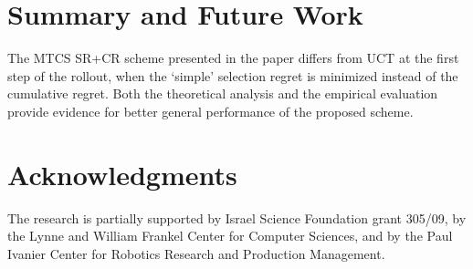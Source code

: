 \documentclass[letterpaper]{article}
\begin{document}
\section{Summary and Future Work}
\label{sec:summary}

The MTCS SR+CR scheme presented in the paper differs
from UCT at the first step of the rollout, when the `simple' selection
regret is minimized instead of the cumulative regret. Both the
theoretical analysis and the empirical evaluation provide evidence for
better general performance of the proposed scheme.

\section*{Acknowledgments}

The research is partially supported by Israel
Science Foundation grant 305/09, by the Lynne and William Frankel
Center for Computer Sciences, and by the Paul Ivanier Center for
Robotics Research and Production Management.

 

\end{document}
